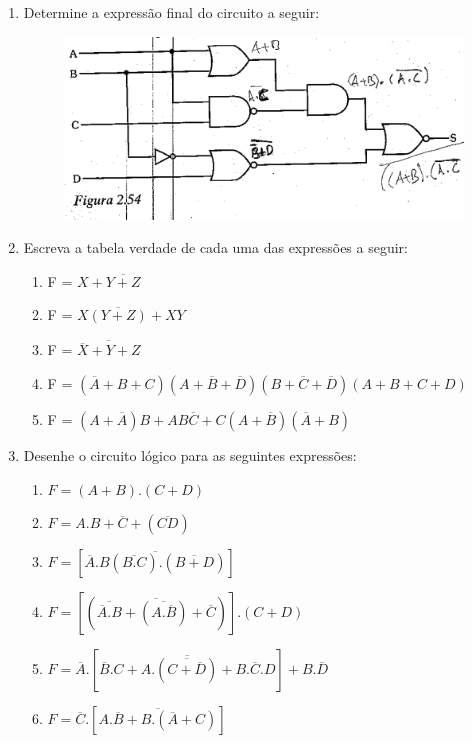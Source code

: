\documentclass[12pt,onepage,a4paper]{memoir}
\begin{document}
\begin{enumerate}
    \item Determine a expressão final do circuito a seguir:
    \begin{figure}[H]
        \centering
        \includegraphics[scale=0.65]{fig/circuito.png}
        \label{fig:circuitoExpressao01}
    \end{figure}


    \item Escreva a tabela verdade de cada uma das expressões a seguir:
    \begin{enumerate}
        \item F = $X+\overline{Y+Z}$
        \item F = $X\overline{(Y+Z)}+XY$
        \item F = $\overline{\overline{X}+Y+Z}$
        \item F =  $(\overline{A}+B+C)(A+\overline{B}+\overline{D})(B+\overline{C}+\overline{D})(A+B+C+D)$
        \item F = $(A+\overline{A})B+AB\overline{C}+C(A+\overline{B})(\overline{A}+B)$
    \end{enumerate}

    \item Desenhe o circuito lógico para as seguintes expressões:
    \begin{enumerate}
        \item $F = (A+B).(C+D)$
        \item $F = A.B+\overline{C}+(\overline{CD})$
        \item $F = [\overline{\overline{A}.B(\overline{B.C}).(\overline{B+D})}]$
        \item $F = [(\overline{\overline{\overline{A}.B}+(\overline{A.\overline{B}})+\overline{C}})].(C+D)$
        \item $F = \overline{A}.[\overline{\overline{B}.C+A.(\overline{C+\overline{D}})+B.\overline{C}.D}]+B.\overline{D}$
        \item $F = \overline{C}.[\overline{A.\overline{B}+B.(\overline{A}+C)}]$
    \end{enumerate}


\end{enumerate}
\end{document}
